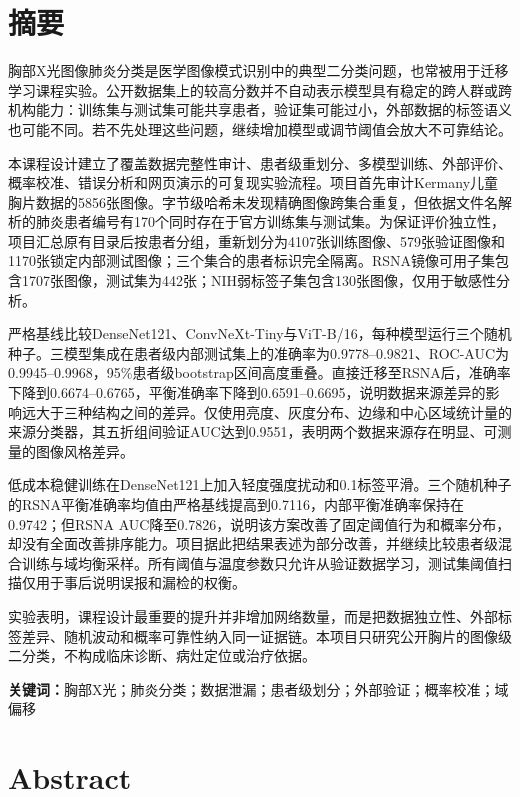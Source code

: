 \chapter*{摘\quad 要}

胸部X光图像肺炎分类是医学图像模式识别中的典型二分类问题，也常被用于迁移学习课程实验。公开数据集上的较高分数并不自动表示模型具有稳定的跨人群或跨机构能力：训练集与测试集可能共享患者，验证集可能过小，外部数据的标签语义也可能不同。若不先处理这些问题，继续增加模型或调节阈值会放大不可靠结论。

本课程设计建立了覆盖数据完整性审计、患者级重划分、多模型训练、外部评价、概率校准、错误分析和网页演示的可复现实验流程。项目首先审计Kermany儿童胸片数据的5856张图像。字节级哈希未发现精确图像跨集合重复，但依据文件名解析的肺炎患者编号有170个同时存在于官方训练集与测试集。为保证评价独立性，项目汇总原有目录后按患者分组，重新划分为4107张训练图像、579张验证图像和1170张锁定内部测试图像；三个集合的患者标识完全隔离。RSNA镜像可用子集包含1707张图像，测试集为442张；NIH弱标签子集包含130张图像，仅用于敏感性分析。

严格基线比较DenseNet121、ConvNeXt-Tiny与ViT-B/16，每种模型运行三个随机种子。三模型集成在患者级内部测试集上的准确率为0.9778--0.9821、ROC-AUC为0.9945--0.9968，95\%患者级bootstrap区间高度重叠。直接迁移至RSNA后，准确率下降到0.6674--0.6765，平衡准确率下降到0.6591--0.6695，说明数据来源差异的影响远大于三种结构之间的差异。仅使用亮度、灰度分布、边缘和中心区域统计量的来源分类器，其五折组间验证AUC达到0.9551，表明两个数据来源存在明显、可测量的图像风格差异。

低成本稳健训练在DenseNet121上加入轻度强度扰动和0.1标签平滑。三个随机种子的RSNA平衡准确率均值由严格基线提高到0.7116，内部平衡准确率保持在0.9742；但RSNA AUC降至0.7826，说明该方案改善了固定阈值行为和概率分布，却没有全面改善排序能力。项目据此把结果表述为部分改善，并继续比较患者级混合训练与域均衡采样。所有阈值与温度参数只允许从验证数据学习，测试集阈值扫描仅用于事后说明误报和漏检的权衡。

实验表明，课程设计最重要的提升并非增加网络数量，而是把数据独立性、外部标签差异、随机波动和概率可靠性纳入同一证据链。本项目只研究公开胸片的图像级二分类，不构成临床诊断、病灶定位或治疗依据。

\noindent\textbf{关键词：}胸部X光；肺炎分类；数据泄漏；患者级划分；外部验证；概率校准；域偏移

\chapter*{Abstract}

